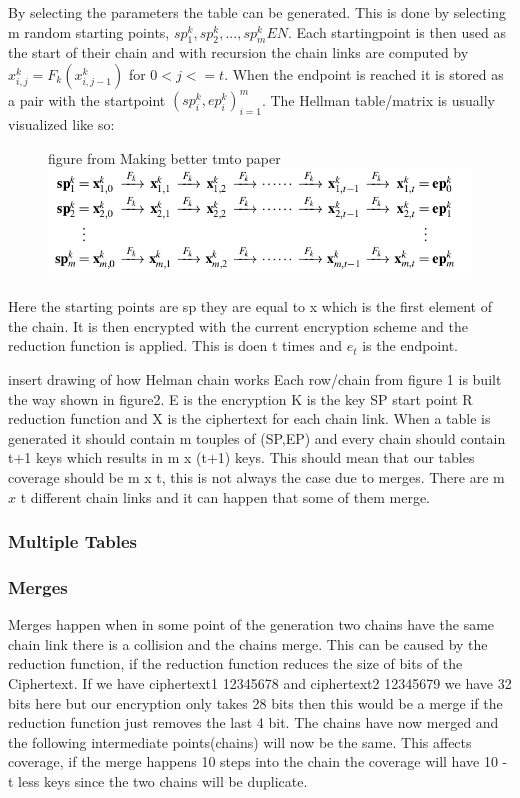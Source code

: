 By selecting the parameters the table can be generated. This is done by selecting m random starting points, $ sp^{k}_1,sp^{k}_2,...,sp^{k}_m E N$. Each startingpoint is then used as the start of their chain and with recursion the chain links are computed by $ x^{k}_{i,j}=F_k( x^{k}_{i,j-1})$ for $0<j<=t$. When the endpoint is reached it is stored as a pair with the startpoint ${( sp^{k}_{i}, ep^{k}_{i})}^{m}_{i=1}$.
The Hellman table/matrix is usually visualized like so:
\\
\begin{figure}[t]
  figure from Making better tmto paper
  \includegraphics[width=\textwidth]{figures/HellmanMatrix.png}
  \centering
\end{figure}

Here the starting points are sp they are equal to x which is the first element of the chain. It is then encrypted with the current encryption scheme and the reduction function is applied. This is doen t times and $e_t$ is the endpoint.

insert drawing of how Helman chain works
Each row/chain from figure 1 is built the way shown in figure2. E is the encryption K is the key SP start point R reduction function and X is the ciphertext for each chain link. When a table is generated it should contain m touples of (SP,EP) and every chain should contain t+1 keys which results in m x (t+1) keys. This should mean that our tables coverage should be m x t, this is not always the case due to merges.
There are m $x$ t different chain links and it can happen that some of them merge.
\subsubsection {Multiple Tables}

\subsubsection{Merges}
Merges happen when in some point of the generation two chains have the same chain link there is a collision and the chains merge. This can be caused by the reduction function, if the reduction function reduces the size of bits of the Ciphertext. If we have ciphertext1 12345678 and ciphertext2 12345679 we have 32 bits here but our encryption only takes 28 bits then this would be a merge if the reduction function just removes the last 4 bit. The chains have now merged and the following intermediate points(chains) will now be the same. This affects coverage, if the merge happens 10 steps into the chain the coverage  will have 10 - t less keys since the two chains will be duplicate.

